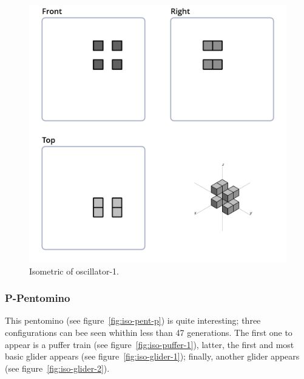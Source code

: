 \begin{figure}
	\centering
	\includegraphics[scale=0.3]{iso_settings/osc_1.png}
	\caption{Isometric of oscillator-1.}
  \label{fig:iso-osc-1}
\end{figure}

\subsubsection{P-Pentomino}
\label{sec:p-pentomino}
This pentomino (see figure~\ref{fig:iso-pent-p}) is quite interesting; three
configurations can bee seen whithin less than 47 generations. The first one to
appear is a puffer train (see figure~\ref{fig:iso-puffer-1}), latter, the first
and most basic glider appears (see figure~\ref{fig:iso-glider-1}); finally,
another glider appears (see figure~\ref{fig:iso-glider-2}).

